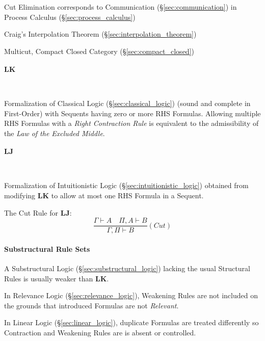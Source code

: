 Cut Elimination corresponds to Communication
(\S\ref{sec:communication}) in Process Calculus
(\S\ref{sec:process_calculus})

Craig's Interpolation Theorem (\S\ref{sec:interpolation_theorem})

Multicut, Compact Closed Category (\S\ref{sec:compact_closed})




\paragraph{$\mathbf{LK}$}\label{sec:lk} \hfill \\\hfill

Formalization of Classical Logic (\S\ref{sec:classical_logic})
(sound and complete in First-Order) with Sequents having zero or more
RHS Formulas. Allowing multiple RHS Formulas with a \emph{Right
  Contraction Rule} is equivalent to the admissibility of the
\emph{Law of the Excluded Middle}.



\paragraph{$\mathbf{LJ}$}\label{sec:lj} \hfill \\\hfill

Formalization of Intuitionistic Logic
(\S\ref{sec:intuitionistic_logic}) obtained from modifying
$\mathbf{LK}$ to allow at most one RHS Formula in a Sequent.

The Cut Rule for $\mathbf{LJ}$:
\[
  \frac{
    \Gamma \vdash A \quad \Pi, A \vdash B
  }{
    \Gamma, \Pi \vdash B
  }(Cut)
\]



\paragraph{Substructural Rule Sets}\label{sec:substructural_rule}\hfill

A Substructural Logic (\S\ref{sec:substructural_logic}) lacking the
usual Structural Rules is usually weaker than $\mathbf{LK}$.

In Relevance Logic (\S\ref{sec:relevance_logic}), Weakening Rules
are not included on the grounds that introduced Formulas are not
\emph{Relevant}.

In Linear Logic (\S\ref{sec:linear_logic}), duplicate Formulas are
treated differently so Contraction and Weakening Rules are is absent
or controlled.



